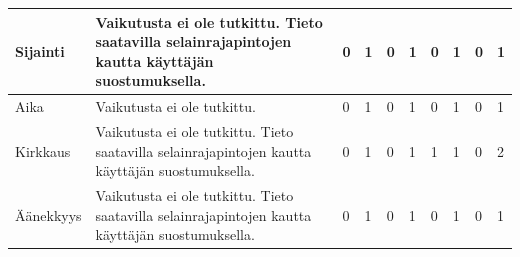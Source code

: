 \documentclass[finnish, 12pt, a4paper, elec, utf8, a-1b, online]{aaltothesis}
\begin{document}
{\begin{longtable}{p{2.5cm}|p{6cm}|p{0.5cm}p{0.5cm}p{0.5cm}|p{0.5cm}|p{0.5cm}p{0.5cm}p{0.5cm}|p{0.5cm}|}
    \midrule
    Sijainti                                & Vaikutusta ei ole tutkittu. Tieto saatavilla selainrajapintojen kautta käyttäjän suostumuksella.                                                                                                                                                                                                                                                                        & 0                                          & 1                                   & 0                                      & 1                            & 0                                               & 1                                         & 0                                         & 1                            \\
    \midrule
    Aika                                    & Vaikutusta ei ole tutkittu.                                                                                                                                                                                                                                                                                                                                             & 0                                          & 1                                   & 0                                      & 1                            & 0                                               & 1                                         & 0                                         & 1                            \\
    \midrule
    Kirkkaus                                & Vaikutusta ei ole tutkittu. Tieto saatavilla selainrajapintojen kautta käyttäjän suostumuksella.                                                                                                                                                                                                                                                                        & 0                                          & 1                                   & 0                                      & 1                            & 1                                               & 1                                         & 0                                         & 2                            \\
    \midrule
    Äänekkyys                               & Vaikutusta ei ole tutkittu. Tieto saatavilla selainrajapintojen kautta käyttäjän suostumuksella.                                                                                                                                                                                                                                                                        & 0                                          & 1                                   & 0                                      & 1                            & 0                                               & 1                                         & 0                                         & 1                            \\

\end{longtable}}
\end{document}
